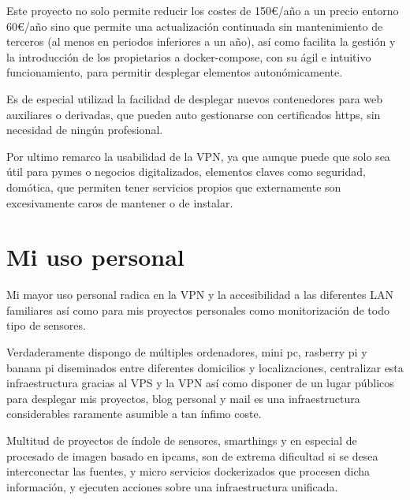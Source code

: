 Este proyecto no solo permite reducir los costes de 150€/año a un precio entorno 60€/año sino que permite una actualización continuada sin mantenimiento de terceros (al menos en periodos inferiores a un año), así como facilita la gestión y la introducción de los propietarios a docker-compose, con su ágil e intuitivo funcionamiento, para permitir desplegar elementos autonómicamente.

Es de especial utilizad la facilidad de desplegar nuevos contenedores para web auxiliares o derivadas, que pueden auto gestionarse con certificados https, sin necesidad de ningún profesional.

 Por ultimo remarco la usabilidad de la VPN, ya que aunque puede que solo sea útil para pymes o negocios digitalizados, elementos claves como seguridad, domótica, que permiten tener servicios propios que externamente son excesivamente caros de mantener o de instalar.

 \section{Mi uso personal}
 Mi mayor uso personal radica en la VPN y la accesibilidad a las diferentes LAN familiares así como para mis proyectos personales como monitorización de todo tipo de sensores.

 Verdaderamente dispongo de múltiples ordenadores, mini pc, rasberry pi y banana pi diseminados entre diferentes domicilios y localizaciones, centralizar esta infraestructura gracias al VPS y la VPN así como disponer de un lugar públicos para desplegar mis proyectos, blog personal y mail es una infraestructura considerables raramente asumible a  tan ínfimo coste.

 Multitud de proyectos de índole de sensores, smarthings y en especial de procesado de imagen basado en ipcams, son de extrema dificultad si se desea interconectar las fuentes, y micro servicios dockerizados que procesen dicha información, y ejecuten acciones sobre una infraestructura unificada.

 